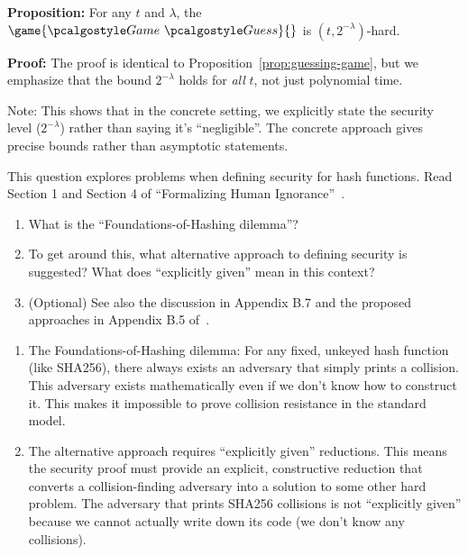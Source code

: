 \ifsolutions
\begin{mysolution}
  \textbf{Proposition:} For any $t$ and $\lambda$, the $\game{\Game~\algo{Guess}}{}$ is $(t, 2^{-\lambda})$-hard.
  
  \textbf{Proof:} The proof is identical to Proposition~\ref{prop:guessing-game}, but we emphasize that the bound $2^{-\lambda}$ holds for \emph{all} $t$, not just polynomial time.
  
  Note: This shows that in the concrete setting, we explicitly state the security level ($2^{-\lambda}$) rather than saying it's ``negligible''.
  The concrete approach gives precise bounds rather than asymptotic statements.
\end{mysolution}
\fi

\begin{exercise}[Optional]\label{ex:foundations-hashing}
  This question explores problems when defining security for hash functions.
  Read Section 1 and Section 4 of ``Formalizing Human Ignorance''~\cite{VIETCRYPT:Rogaway06}.
  \begin{enumerate}
    \item What is the ``Foundations-of-Hashing dilemma''?
    \item To get around this, what alternative approach to defining security is suggested?
    What does ``explicitly given'' mean in this context?
    \item (Optional) See also the discussion in Appendix B.7 and the proposed approaches in Appendix B.5 of~\cite{AC:BerLan13}.
  \end{enumerate}
\end{exercise}

\ifsolutions
\begin{mysolution}
  \begin{enumerate}
    \item The Foundations-of-Hashing dilemma: For any fixed, unkeyed hash function (like SHA256), there always exists an adversary that simply prints a collision.
    This adversary exists mathematically even if we don't know how to construct it.
    This makes it impossible to prove collision resistance in the standard model.
    \item The alternative approach requires ``explicitly given'' reductions.
    This means the security proof must provide an explicit, constructive reduction that converts a collision-finding adversary into a solution to some other hard problem.
    The adversary that prints SHA256 collisions is not ``explicitly given'' because we cannot actually write down its code (we don't know any collisions).
  \end{enumerate}
\end{mysolution}
\fi
